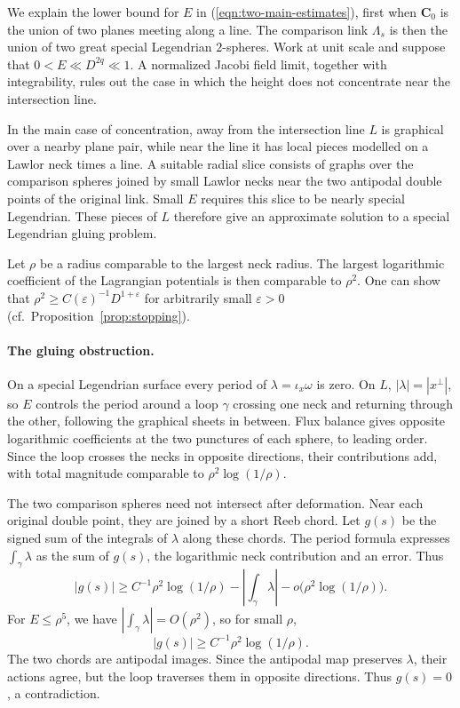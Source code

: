 \documentclass[11pt,a4paper]{article}
\numberwithin{equation}{section}
\theoremstyle{definition}
\theoremstyle{remark}
\begin{document}
	We explain the lower bound for $E$ in (\ref{eqn:two-main-estimates}),
	first when $\mathbf C_0$ is the union of two planes meeting along a line.
	The comparison link $\Lambda_s$ is then the union of two great special
	Legendrian $2$-spheres. Work at unit scale and suppose that
	$0<E\ll D^{2q}\ll1$.
	A normalized Jacobi field limit, together with integrability, rules
	out the case in which the height does not concentrate near the
	intersection line.
	
	In the main case of concentration, away from the intersection line
	$L$ is graphical over a nearby plane pair, while near the line it has local pieces
	modelled on a Lawlor neck times a line. A suitable radial slice
	consists of graphs over the comparison spheres joined by small Lawlor
	necks near the two antipodal double points of the original link.
	Small $E$ requires this slice
	to be nearly special Legendrian. These pieces of $L$ therefore give an
	approximate solution to a special Legendrian gluing problem.
	
	Let $\rho$ be a radius comparable to the largest neck radius.
	The largest logarithmic coefficient of the Lagrangian
	potentials is then comparable to $\rho^2$.
	One can show that $\rho^2\ge C(\varepsilon)^{-1}D^{1+\varepsilon}$
	for arbitrarily small $\varepsilon>0$ (cf.\ Proposition~\ref{prop:stopping}).
	
	\paragraph{The gluing obstruction.}
	On a special Legendrian surface every period of
	$\lambda=\iota_x\omega$ is zero. On $L$, $|\lambda|=|x^\perp|$, so
	$E$ controls the period around a loop $\gamma$ crossing one neck and returning
	through the other, following the graphical sheets in between.
	Flux balance gives opposite logarithmic coefficients at the two
	punctures of each sphere, to leading order. Since the loop crosses
	the necks in opposite directions, their contributions add, with total
	magnitude comparable to $\rho^2\log(1/\rho)$.
	
	The two comparison spheres need not intersect after deformation.
	Near each original double point, they are joined by a short Reeb chord.
	Let $g(s)$ be the signed sum of the integrals of $\lambda$ along
	these chords. The period formula expresses
	$\int_\gamma\lambda$ as the sum of $g(s)$, the logarithmic neck
	contribution and an error. Thus
	\[
	|g(s)|\ge C^{-1}\rho^2\log(1/\rho)
	-\left|\int_\gamma\lambda\right|
	-o\bigl(\rho^2\log(1/\rho)\bigr).
	\]
	For $E\le\rho^5$, we have $|\int_\gamma\lambda|=O(\rho^2)$,
	so for small $\rho$,
	\[
	|g(s)|\ge C^{-1}\rho^2\log(1/\rho).
	\]
	The two chords are antipodal images. Since the antipodal map preserves
	$\lambda$, their actions agree, but the loop traverses them in opposite
	directions. Thus $g(s)=0$, a contradiction.
	
\end{document}
